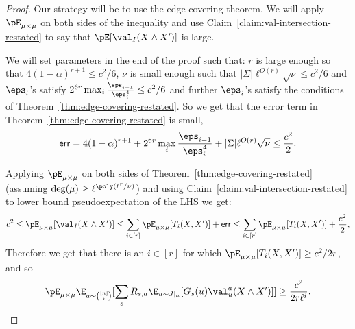 \begin{proof}
Our strategy will be to use the edge-covering theorem. We will apply $\pE_{\mu \times \mu}$ on both sides of the inequality and use Claim~\ref{claim:val-intersection-restated} to say that $\pE[\val_I(X \wedge X')]$ is large. 

We will set parameters in the end of the proof such that: $r$ is large enough so that $4(1-\alpha)^{r+1} \leq c^2/6$, $\nu$ is small enough such that $|\Sigma|\ell^{O(r)}\sqrt{\nu} \leq c^2/6$ and $\eps_i$'s satisfy $2^{6r}\max_{i}\frac{\eps_{i-1}}{\eps_i^4} \leq c^2/6$ and further $\eps_i$'s satisfy the conditions of Theorem~\ref{thm:edge-covering-restated}. So we get that the error term in Theorem~\ref{thm:edge-covering-restated} is small, 
\begin{equation}\label{eq:error}
{\sf err} = 4(1-\alpha)^{r+1} + 2^{6r}\max_{i}\frac{\eps_{i-1}}{\eps_i^4}+ |\Sigma|\ell^{O(r)}\sqrt{\nu} \leq \frac{c^2}{2}.
\end{equation}

Applying $\pE_{\mu \times \mu}$ on both sides of Theorem~\ref{thm:edge-covering-restated} (assuming $\deg(\mu) \geq \ell^{\poly(\ell^r/\nu)}$) and 
using Claim~\ref{claim:val-intersection-restated} to lower bound pseudoexpectation of the LHS we get:
\[
c^2
\leq
\pE_{\mu \times \mu}[\val_I(X \wedge X')]
\leq \sum_{i \in [r]} \pE_{\mu \times \mu}[T_i(X,X')]+{\sf err}
\leq \sum_{i \in [r]} \pE_{\mu \times \mu}[T_i(X,X')] + \frac{c^2}{2},\]
Therefore we get that there is an $i \in [r]$ for which $\pE_{\mu \times \mu}[T_i(X,X')] \geq c^2/2r$, and so
\begin{equation}\label{eq:low-comp1}
\pE_{\mu \times \mu}\E_{a \sim {[n] \choose i}}[\sum_s R_{s,a} \E_{u \sim J|_a}[G_s(u)\val^a_u(X \wedge X')]] \geq \frac{c^2}{2r\ell^i}.
\end{equation}


\end{proof}
